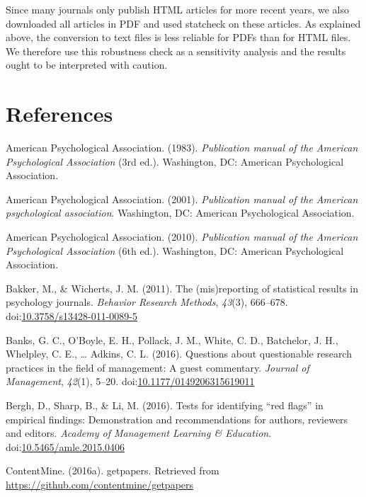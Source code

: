 \documentclass[english,floatsintext,man]{apa6}
\newcounter{author}
\begin{document}
Since many journals only publish HTML articles for more recent years, we
also downloaded all articles in PDF and used statcheck on these
articles. As explained above, the conversion to text files is less
reliable for PDFs than for HTML files. We therefore use this robustness
check as a sensitivity analysis and the results ought to be interpreted
with caution.

\section*{References}\label{references}

\hypertarget{refs}{}
\hypertarget{ref-apa1983}{}
American Psychological Association. (1983). \emph{Publication manual of
the American Psychological Association} (3rd ed.). Washington, DC:
American Psychological Association.

\hypertarget{ref-apa2001}{}
American Psychological Association. (2001). \emph{Publication manual of
the American psychological association}. Washington, DC: American
Psychological Association.

\hypertarget{ref-apa2010}{}
American Psychological Association. (2010). \emph{Publication manual of
the American Psychological Association} (6th ed.). Washington, DC:
American Psychological Association.

\hypertarget{ref-Bakker2011}{}
Bakker, M., \& Wicherts, J. M. (2011). The (mis)reporting of statistical
results in psychology journals. \emph{Behavior Research Methods},
\emph{43}(3), 666--678.
doi:\href{https://doi.org/10.3758/s13428-011-0089-5}{10.3758/s13428-011-0089-5}

\hypertarget{ref-Banks2016}{}
Banks, G. C., O'Boyle, E. H., Pollack, J. M., White, C. D., Batchelor,
J. H., Whelpley, C. E., \ldots{} Adkins, C. L. (2016). Questions about
questionable research practices in the field of management: A guest
commentary. \emph{Journal of Management}, \emph{42}(1), 5--20.
doi:\href{https://doi.org/10.1177/0149206315619011}{10.1177/0149206315619011}

\hypertarget{ref-Bergh2016a}{}
Bergh, D., Sharp, B., \& Li, M. (2016). Tests for identifying ``red
flags'' in empirical findings: Demonstration and recommendations for
authors, reviewers and editors. \emph{Academy of Management Learning \&
Education}.
doi:\href{https://doi.org/10.5465/amle.2015.0406}{10.5465/amle.2015.0406}

\hypertarget{ref-getpapers}{}
ContentMine. (2016a). getpapers. Retrieved from
\url{https://github.com/contentmine/getpapers}
\end{document}

